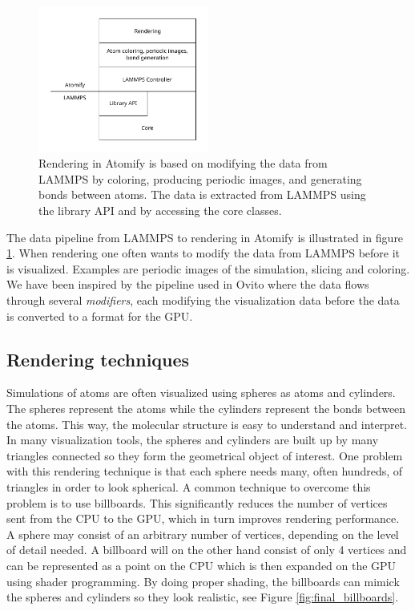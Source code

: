 \documentclass[aps,pre,twocolumn,letterpaper,floatfix,nofootinbib]{revtex4}
\begin{document}
\begin{figure}
	\centering
	\includegraphics[width=0.5\textwidth]{figures/data-pipeline.pdf}
	\caption{Rendering in Atomify is based on modifying the data from LAMMPS
    by coloring, producing periodic images, and generating bonds between atoms.
    The data is extracted from LAMMPS using the library API and by accessing
    the core classes.}
	\label{fig:data-pipeline}
\end{figure}

The data pipeline from LAMMPS to rendering in Atomify is illustrated in figure
\ref{fig:data-pipeline}.
When rendering one often wants to modify the data from LAMMPS before it is
visualized.
Examples are periodic images of the simulation,
slicing and coloring.
We have been inspired by the pipeline used in Ovito where the data flows through
several \textit{modifiers}, each modifying the visualization data before the
data is converted to a format for the GPU.

\subsection{Rendering techniques}

Simulations of atoms are often visualized using spheres as atoms and cylinders.
The spheres represent the atoms while the cylinders represent the bonds between
the atoms.
This way, the molecular structure is easy to understand and interpret.
In many visualization tools, the spheres and cylinders are built up by many
triangles connected so they form the geometrical object of interest.
One problem with this rendering technique is that each sphere needs many,
often hundreds, of triangles in order to look spherical.
A common technique to overcome this problem is to use billboards.
This significantly reduces the number of vertices sent from the CPU to the GPU,
which in turn improves rendering performance.
A sphere may consist of an arbitrary number of vertices,
depending on the level of detail needed.
A billboard will on the other hand consist of only 4 vertices and can be
represented as a point on the CPU which is then expanded on the GPU using shader
programming.
By doing proper shading, the billboards can mimick the spheres and cylinders so
they look realistic, see Figure \ref{fig:final_billboards}.
\end{document}
